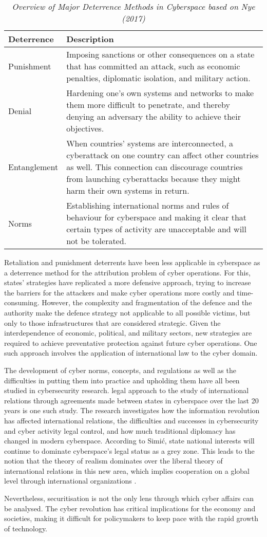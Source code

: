 \vspace{1cm}
\begin{table}[htbp]
  \centering
  \caption{\emph{Overview of Major Deterrence Methods in Cyberspace based on Nye (2017)}}
  \begin{tabular}{p{3cm}p{9cm}}
    \toprule
    \textbf{Deterrence} & \textbf{Description} \\
    \midrule
    Punishment & Imposing sanctions or other consequences on a state that has committed an attack, such as economic penalties, diplomatic isolation, and military action. \\
    Denial & Hardening one's own systems and networks to make them more difficult to penetrate, and thereby denying an adversary the ability to achieve their objectives. \\
    Entanglement & When countries' systems are interconnected, a cyberattack on one country can affect other countries as well. This connection can discourage countries from launching cyberattacks because they might harm their own systems in return. \\
    Norms & Establishing international norms and rules of behaviour for cyberspace and making it clear that certain types of activity are unacceptable and will not be tolerated. \\
    \bottomrule
  \end{tabular}
\end{table}
\vspace{1cm}

Retaliation and punishment deterrents have been less applicable in cyberspace as a deterrence method for the attribution problem of cyber operations. For this, states’ strategies have replicated a more defensive approach, trying to increase the barriers for the attackers and make cyber operations more costly and time-consuming. However, the complexity and fragmentation of the defence and the authority make the defence strategy not applicable to all possible victims, but only to those infrastructures that are considered strategic. Given the interdependence of economic, political, and military sectors, new strategies are required to achieve preventative protection against future cyber operations. One such approach involves the application of international law to the cyber domain. 


The development of cyber norms, concepts, and regulations as well as the difficulties in putting them into practice and upholding them have all been studied in cybersecurity research. \textcite{simi_2021_cyber} legal approach to the study of international relations through agreements made between states in cyberspace over the last 20 years is one such study. The research investigates how the information revolution has affected international relations, the difficulties and successes in cybersecurity and cyber activity legal control, and how much traditional diplomacy has changed in modern cyberspace. According to Simić, state national interests will continue to dominate cyberspace's legal status as a grey zone. This leads to the notion that the theory of realism dominates over the liberal theory of international relations in this new area, which implies cooperation on a global level through international organizations \autocite{simi_2021_cyber}.


Nevertheless, securitisation is not the only lens through which cyber affairs can be analysed. The cyber revolution has critical implications for the economy and societies, making it difficult for policymakers to keep pace with the rapid growth of technology.  


